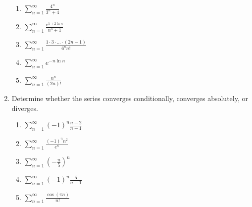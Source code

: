 \documentclass[letterpaper]{article}
\begin{document}
\begin{enumerate}
\begin{enumerate}
	\item $\sum_{n=1}^\infty \frac{4^n}{3^n+4}$

	\item $\sum_{n=1}^\infty \frac{e^{1+2\ln n}}{n^3+1}$

	\item $\sum_{n=1}^\infty \frac{1\cdot 3 \cdot \dots \cdot (2n-1)}{6^n n!}$

	\item $\sum_{n=1}^\infty e^{-n\ln n}$

	\item $\sum_{n=1}^\infty \frac{n^n}{(2n)!}$
	\end{enumerate}


\item Determine whether the series converges conditionally, converges absolutely, or diverges.
	\begin{enumerate}

	\item $\sum_{n=1}^\infty (-1)^n\frac{n+2}{n+1}$

	\item $\sum_{n=1}^\infty \frac{(-1)^n n^2}{e^n}$

	\item $\sum_{n=1}^\infty \left(-\frac n5\right)^n$

	\item $\sum_{n=1}^\infty (-1)^n\frac{5}{n+1}$

	\item $\sum_{n=1}^\infty \frac {\cos (\pi n)} {n!}$
	\end{enumerate}


\end{enumerate}
\end{document}
